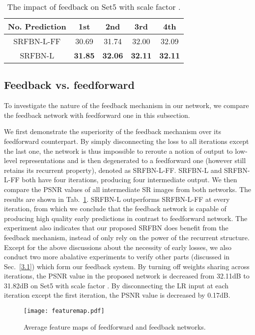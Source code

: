\documentclass[10pt,twocolumn,letterpaper]{article}
\begin{document}
	\begin{table}[!htbp]
		\centering
		\begin{tabular}{|c|c|c|c|c|}
			\hline
			No. Prediction & 1st & 2nd    & 3rd    & 4th    \\ \hline\hline
			SRFBN-L-FF &  30.69  & 31.74 & 32.00 & 32.09 \\ \hline
			SRFBN-L    &  \textbf{31.85}  & \textbf{32.06} & \textbf{32.11} & \textbf{32.11} \\ \hline
		\end{tabular}\smallskip
		\caption{The impact of feedback on Set5 with scale factor .\label{ff_vs_fb}}
		\vspace{-0.45cm}			
	\end{table}
	
	\subsection{Feedback vs. feedforward}
	To investigate the nature of the feedback mechanism in our network, we compare the feedback network with feedforward one in this subsection.
	
	We first demonstrate the superiority of the feedback mechanism over its feedforward counterpart. By simply disconnecting the loss to all iterations except the last one, the network is thus impossible to reroute a notion of output to low-level representations and is then degenerated to a feedforward one (however still retains its recurrent property), denoted as SRFBN-L-FF. SRFBN-L and SRFBN-L-FF both have four iterations, producing four intermediate output. We then compare the PSNR values of all intermediate SR images from both networks. The results are shown in Tab.~\ref{ff_vs_fb}. SRFBN-L outperforms SRFBN-L-FF at every iteration, from which we conclude that the feedback network is capable of producing high quality early predictions in contrast to feedforward network. The experiment also indicates that our proposed SRFBN does benefit from the feedback mechanism, instead of only rely on the power of the recurrent structure. Except for the above discussions about the necessity of early losses, we also conduct two more abalative experiments to verify other parts (discussed in Sec.~\ref{3.1}) which form our feedback system. By turning off weights sharing across iterations, the PSNR value in the proposed network is decreased from 32.11dB to 31.82dB on Set5 with scale factor . By disconnecting the LR input at each iteration except the first iteration, the PSNR value is decreased by 0.17dB. 
	\vspace{-0.4cm}
	\begin{figure}[!htbp]
		\centering
		\texttt{[image: featuremap.pdf]}
		\caption{Average feature maps of feedforward and feedback networks.}
		\label{featuremap}
\end{figure}
\end{document}
